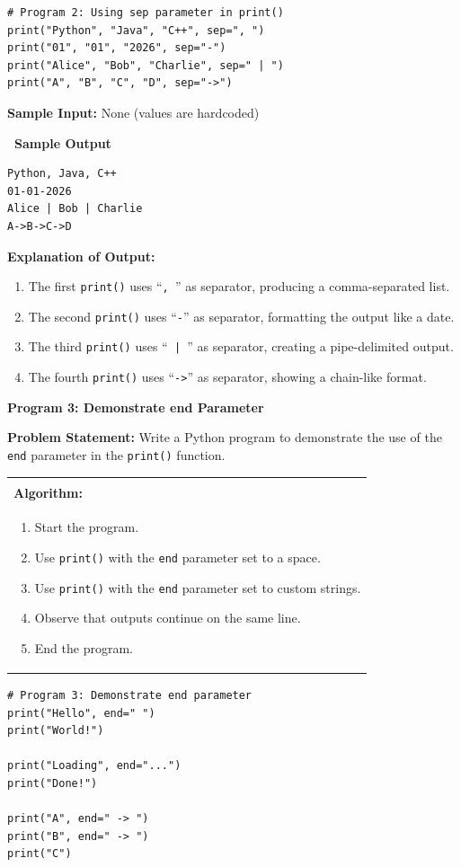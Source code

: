 \documentclass[12pt,a4paper]{article}
\makeatletter
\newcommand{\outhead}{\noindent\colorbox{cmrgreen!25}%
  {\textbf{\small\color{cmrdark}~Sample Output~}}\par\vspace{-1pt}}
\newenvironment{algobox}{%
  \par\vspace{4pt}%
  \noindent\begin{tabular}{@{}p{\linewidth}@{}}%
  \hline\\[-8pt]%
  \textbf{\color{blue!60!black}\small Algorithm:}\\[2pt]%
}{%
  \\[-4pt]\hline%
  \end{tabular}\par\vspace{4pt}%
}
\makeatother
\begin{document}
\begin{lstlisting}
# Program 2: Using sep parameter in print()
print("Python", "Java", "C++", sep=", ")
print("01", "01", "2026", sep="-")
print("Alice", "Bob", "Charlie", sep=" | ")
print("A", "B", "C", "D", sep="->")
\end{lstlisting}

\textbf{Sample Input:} None (values are hardcoded)

\outhead
\begin{lstlisting}[style=outputstyle]
Python, Java, C++
01-01-2026
Alice | Bob | Charlie
A->B->C->D
\end{lstlisting}

\textbf{Explanation of Output:}
\begin{enumerate}
  \item The first \texttt{print()} uses ``\texttt{, }'' as separator, producing a comma-separated list.
  \item The second \texttt{print()} uses ``\texttt{-}'' as separator, formatting the output like a date.
  \item The third \texttt{print()} uses ``\texttt{ | }'' as separator, creating a pipe-delimited output.
  \item The fourth \texttt{print()} uses ``\texttt{->}'' as separator, showing a chain-like format.
\end{enumerate}

\vspace{0.5cm}

\textbf{Program 3: Demonstrate end Parameter}

\textbf{Problem Statement:}
Write a Python program to demonstrate the use of the \texttt{end} parameter in the \texttt{print()} function.

\begin{algobox}
\begin{enumerate}[label=Step \arabic*:]
  \item Start the program.
  \item Use \texttt{print()} with the \texttt{end} parameter set to a space.
  \item Use \texttt{print()} with the \texttt{end} parameter set to custom strings.
  \item Observe that outputs continue on the same line.
  \item End the program.
\end{enumerate}
\end{algobox}

\begin{lstlisting}
# Program 3: Demonstrate end parameter
print("Hello", end=" ")
print("World!")

print("Loading", end="...")
print("Done!")

print("A", end=" -> ")
print("B", end=" -> ")
print("C")
\end{lstlisting}
\end{document}
